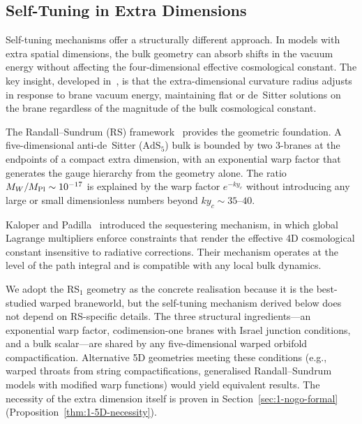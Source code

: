 \subsection{Self-Tuning in Extra Dimensions}
\label{sec:1-self-tuning}

Self-tuning mechanisms offer a structurally different approach. In models with extra spatial dimensions, the bulk geometry can absorb shifts in the vacuum energy without affecting the four-dimensional effective cosmological constant. The key insight, developed in~\cite{ch1:arkani00,ch1:kachru00,ch1:carroll03}, is that the extra-dimensional curvature radius adjusts in response to brane vacuum energy, maintaining flat or de~Sitter solutions on the brane regardless of the magnitude of the bulk cosmological constant.

The Randall--Sundrum (RS) framework~\cite{ch1:rs1,ch1:rs2} provides the geometric foundation. A five-dimensional anti-de~Sitter ($\mathrm{AdS}_5$) bulk is bounded by two 3-branes at the endpoints of a compact extra dimension, with an exponential warp factor that generates the gauge hierarchy from the geometry alone. The ratio $M_W/M_{\mathrm{Pl}} \sim 10^{-17}$ is explained by the warp factor $e^{-ky_c}$ without introducing any large or small dimensionless numbers beyond $ky_c \sim 35$--$40$.

Kaloper and Padilla~\cite{ch1:kaloper14} introduced the sequestering mechanism, in which global Lagrange multipliers enforce constraints that render the effective 4D cosmological constant insensitive to radiative corrections. Their mechanism operates at the level of the path integral and is compatible with any local bulk dynamics.

We adopt the RS$_1$ geometry as the concrete realisation because it is the best-studied warped braneworld, but the self-tuning mechanism derived below does not depend on RS-specific details. The three structural ingredients---an exponential warp factor, codimension-one branes with Israel junction conditions, and a bulk scalar---are shared by any five-dimensional warped orbifold compactification. Alternative 5D geometries meeting these conditions (e.g., warped throats from string compactifications, generalised Randall--Sundrum models with modified warp functions) would yield equivalent results. The necessity of the extra dimension itself is proven in Section~\ref{sec:1-nogo-formal} (Proposition~\ref{thm:1-5D-necessity}).

